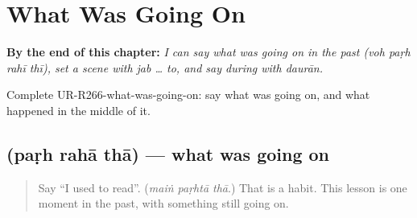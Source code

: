 
\chapter{What Was Going On}
\label{ch:ur-what-was-going-on}

\begin{chapteropening}
\textbf{By the end of this chapter:} \emph{I can say what was going on in the past (voh paṛh rahī thī), set a scene with jab … to, and say during with daurān.}

Complete UR-R266-what-was-going-on: say what was going on, and what happened in the middle of it.
\end{chapteropening}

\section[\texorpdfstring{\ur{پڑھ} \ur{رہا} \ur{تھا} (paṛh rahā thā)}{پڑھ رہا تھا (paṛh rahā thā)}]{   (paṛh rahā thā) — what was going on}

\label{lesson:UR-C266-parh-raha-tha}



\begin{quote}
Say \textquotedblleft{}I used to read\textquotedblright{}. (\emph{maiṅ paṛhtā thā}.) That is a habit. This lesson is one moment in the past, with something still going on.
\end{quote}

